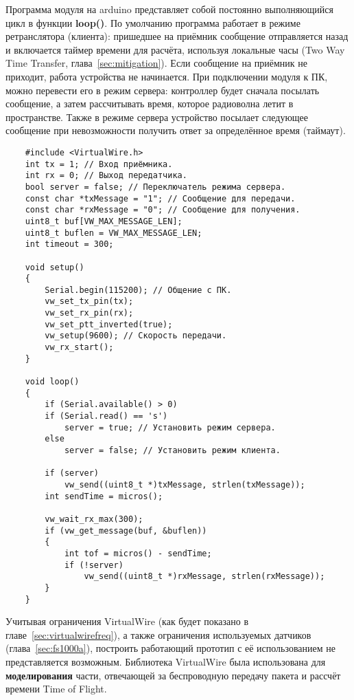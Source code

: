Программа модуля на arduino представляет собой постоянно выполняющийся цикл в функции \textbf{loop()}. По умолчанию программа работает в режиме ретранслятора (клиента): пришедшее на приёмник сообщение отправляется назад и включается таймер времени для расчёта, используя локальные часы (Two Way Time Transfer, глава~\ref{sec:mitigation}). Если сообщение на приёмник не приходит, работа устройства не начинается. При подключении модуля к ПК, можно перевести его в режим сервера: контроллер будет сначала посылать сообщение, а затем рассчитывать время, которое радиоволна летит в пространстве. Также в режиме сервера устройство посылает следующее сообщение при невозможности получить ответ за определённое время (таймаут).

\begin{verbatim}
    #include <VirtualWire.h>
    int tx = 1; // Вход приёмника.
    int rx = 0; // Выход передатчика.
    bool server = false; // Переключатель режима сервера.
    const char *txMessage = "1"; // Сообщение для передачи.
    const char *rxMessage = "0"; // Сообщение для получения.
    uint8_t buf[VW_MAX_MESSAGE_LEN];
    uint8_t buflen = VW_MAX_MESSAGE_LEN;
    int timeout = 300;

    void setup()
    {
        Serial.begin(115200); // Общение с ПК.
        vw_set_tx_pin(tx);
        vw_set_rx_pin(rx);
        vw_set_ptt_inverted(true);
        vw_setup(9600); // Скорость передачи.
        vw_rx_start();
    }

    void loop()
    {
        if (Serial.available() > 0)
        if (Serial.read() == 's')
            server = true; // Установить режим сервера.
        else
            server = false; // Установить режим клиента.

        if (server)
            vw_send((uint8_t *)txMessage, strlen(txMessage));
        int sendTime = micros();

        vw_wait_rx_max(300);
        if (vw_get_message(buf, &buflen))
        {
            int tof = micros() - sendTime;
            if (!server)
                vw_send((uint8_t *)rxMessage, strlen(rxMessage));
        }
    }
\end{verbatim}

Учитывая ограничения VirtualWire (как будет показано в главе~\ref{sec:virtualwirefreq}), а также ограничения используемых датчиков (глава~\ref{sec:fs1000a}), построить работающий прототип с её использованием не представляется возможным. Библиотека VirtualWire была использована для \textbf{моделирования} части, отвечающей за беспроводную передачу пакета и рассчёт времени Time of Flight.
